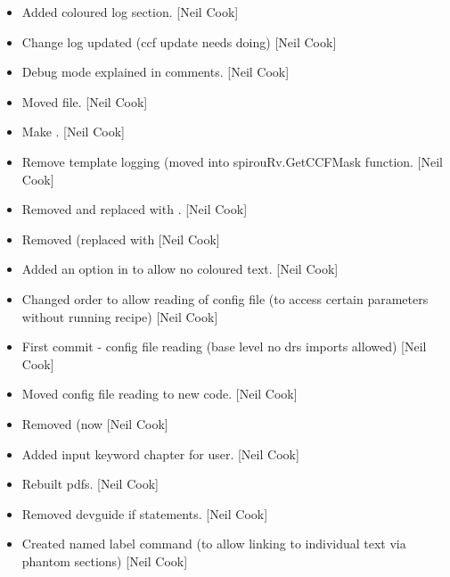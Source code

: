 \documentclass[a4paper,10pt,english]{report}
\begin{document}
\begin{itemize}
\item {} 
Added coloured log section. {[}Neil Cook{]}

\item {} 
Change log updated (ccf update needs doing) {[}Neil Cook{]}

\item {} 
Debug mode explained in comments. {[}Neil Cook{]}

\item {} 
Moved file. {[}Neil Cook{]}

\item {} 
Make  . {[}Neil Cook{]}

\item {} 
Remove template logging (moved into spirouRv.GetCCFMask function.
{[}Neil Cook{]}

\item {} 
Removed  and replaced with . {[}Neil Cook{]}

\item {} 
Removed  (replaced with  {[}Neil Cook{]}

\item {} 
Added an option in  to allow no coloured text. {[}Neil Cook{]}

\item {} 
Changed order to allow reading of config file (to access certain
parameters without running recipe) {[}Neil Cook{]}

\item {} 
First commit - config file reading (base level no drs imports allowed)
{[}Neil Cook{]}

\item {} 
Moved config file reading to new code. {[}Neil Cook{]}

\item {} 
Removed  (now  {[}Neil Cook{]}

\item {} 
Added input keyword chapter for user. {[}Neil Cook{]}

\item {} 
Rebuilt pdfs. {[}Neil Cook{]}

\item {} 
Removed devguide if statements. {[}Neil Cook{]}

\item {} 
Created named label command (to allow linking to individual text via
phantom sections) {[}Neil Cook{]}


\end{itemize}
\end{document}
